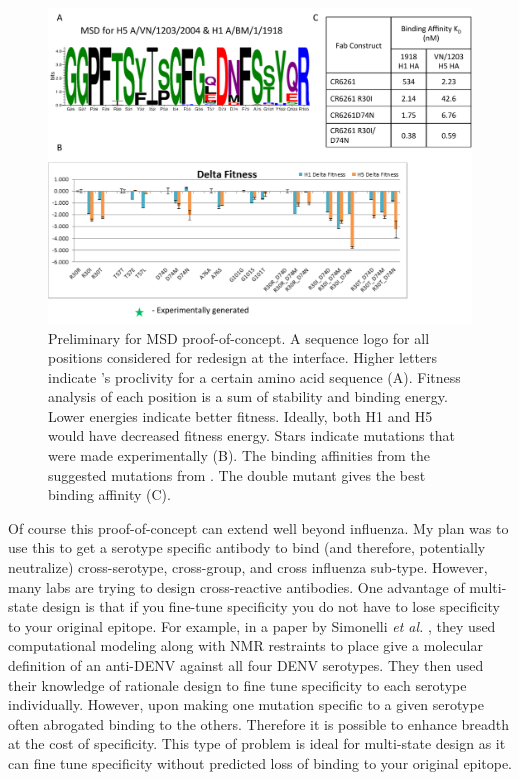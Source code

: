 \begin{figure}[!t]
   \centering
   \includegraphics[width=.9\textwidth]{images/chapter5/figure5_2.pdf}
   \caption[Preliminary for MSD Proof-of-Concept]{Preliminary for MSD proof-of-concept. A sequence logo for all positions considered for redesign at the interface. Higher letters indicate \rosetta's proclivity for a certain amino acid sequence (A). Fitness analysis of each position is a sum of stability and binding energy. Lower energies indicate better fitness. Ideally, both H1 and H5 would have decreased fitness energy. Stars indicate mutations that were made experimentally (B). The binding affinities from the suggested mutations from \rosetta. The double mutant gives the best binding affinity (C).}
       \label{fig:fig5_2}
\end{figure}

Of course this proof-of-concept can extend well beyond influenza. My plan was to use this to get a serotype specific antibody to bind (and therefore, potentially neutralize) cross-serotype, cross-group, and cross influenza sub-type. However, many labs are trying to design cross-reactive antibodies. One advantage of multi-state design is that if you fine-tune specificity you do not have to lose specificity to your original epitope. For example, in a paper by Simonelli \textit{et al.} \citep{Simonelli:2013jc}, they used computational modeling along with NMR restraints to place give a molecular definition of an anti-DENV against all four DENV serotypes. They then used their knowledge of rationale design to fine tune specificity to each serotype individually. However, upon making one mutation specific to a given serotype often abrogated binding to the others. Therefore it is possible to enhance breadth at the cost of specificity. This type of problem is ideal for multi-state design as it can fine tune specificity without predicted loss of binding to your original epitope.

